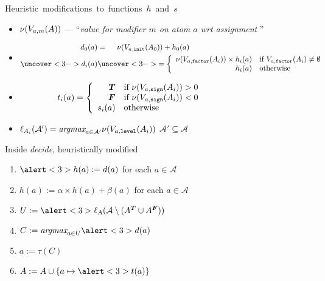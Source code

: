 \documentclass[t]{beamer}
\begin{document}
\begin{frame}{Heuristic~modifications~to~functions~$h$~and~$s$}
  \medskip
  \begin{itemize}
  \item<2-> $\nu(V_{a,m}(A))$ --- ``{\em value for modifier $m$ on atom $a$ wrt assignment \ass}''
    \medskip
  \item<3-> 
    \begin{align*}
      d_0(a)&=\quad\;\nu(V_{a,\mathtt{init}}(\ass_0))+h_0(a)
      \\
      \uncover<3->{d_i(a)}&\uncover<3->{=
        \left\{
          \begin{array}{rl}
            \nu(V_{a,\mathtt{factor}}(\ass_i))\times h_i(a)&\text{if } V_{a,\mathtt{factor}}(\ass_i)\neq\emptyset
            \\
            h_i(a)&\text{otherwise}
          \end{array}
        \right.}
    \end{align*}
  \item<3-> 
    \begin{align*}
      t_i(a)&=
      \left\{
        \begin{array}{rl}
          \boldsymbol{T} &\text{if }
          \nu(V_{a,\mathtt{sign}}(A_i))>0
          \\
          \boldsymbol{F}&\text{if }
          \nu(V_{a,\mathtt{sign}}(A_i))<0
          \\
          s_i(a)&\text{otherwise}
        \end{array}
      \right.\qquad\qquad\qquad\quad\;
    \end{align*}
  \item<3->  \quad
    \(
    \ell_{A_i}(\mathcal{A}')=\textit{argmax}_{a\in\mathcal{A}'}\nu(V_{a,\mathtt{level}}(A_i))
    \)
    \qquad
    $\mathcal{A}'\subseteq\mathcal{A}$
  \end{itemize}
\end{frame}
\begin{frame}[c]{Inside \alert<1>{\textit{decide}}, {heuristically modified}}
  \pause
  \begin{enumerate}\addtocounter{enumi}{-1}
  \item $\alert<3>{h(a) := d(a)}$                         \hfill for each $a\in\mathcal{A}\qquad$
  \item $h(a) := \alpha\times h(a) + \beta(a)$ \hfill for each $a\in\mathcal{A}\qquad$
  \item $U:=\alert<3>{\ell_{\ass}}(\mathcal{A}\setminus (\tlits{\ass}\cup\flits{\ass}))$
  \item $C:= \textit{argmax}_{a\in U}\alert<3>{d}(a)$
  \item $a:= \tau(C)$
  \item $\ass := \ass\cup\{a\mapsto\alert<3>{t}(a)\}$
  \end{enumerate}
\end{frame}
\end{document}
